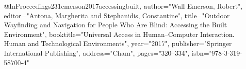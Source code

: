 @InProceedings{231emerson2017accessingbuilt,
author="Wall Emerson, Robert",
editor="Antona, Margherita
and Stephanidis, Constantine",
title="Outdoor Wayfinding and Navigation for People Who Are Blind: Accessing the Built Environment",
booktitle="Universal Access in Human--Computer Interaction. Human and Technological Environments",
year="2017",
publisher="Springer International Publishing",
address="Cham",
pages="320--334",
isbn="978-3-319-58700-4"
}